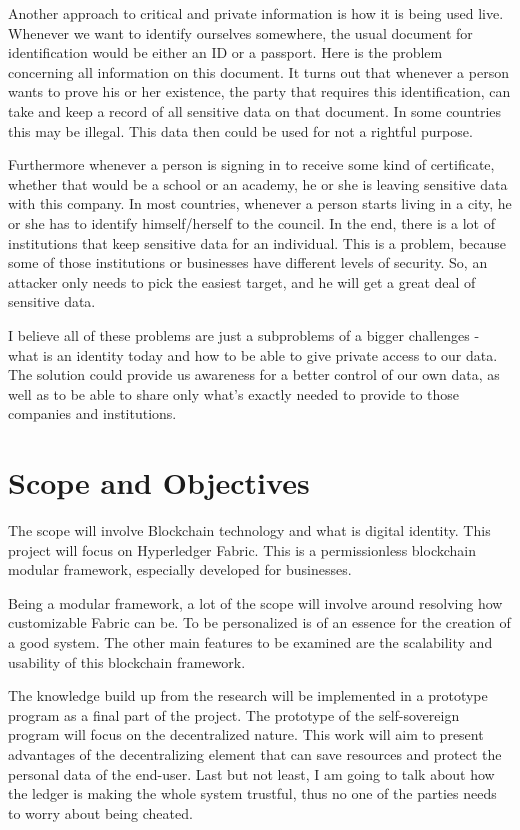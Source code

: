 \documentclass[a4paper,11pt]{report}
\begin{document}
		Another approach to critical and private information is how it is being used live. Whenever we want to identify ourselves somewhere, the usual document for identification would be either an ID or a passport. Here is the problem concerning all information on this document. It turns out that whenever a person wants to prove his or her existence, the party that requires this identification, can take and keep a record of all sensitive data on that document. In some countries this may be illegal. This data then could be used for not a rightful purpose. \cite{alboaie2017private}
		
Furthermore whenever a person is signing in to receive some kind of certificate, whether that would be a school or an academy, he or she is leaving sensitive data with this company. In most countries, whenever a person starts living in a city, he or she has to identify himself/herself to the council. In the end, there is a lot of institutions that keep sensitive data for an individual. This is a problem, because some of those institutions or businesses have different levels of security. So, an attacker only needs to pick the easiest target, and he will get a great deal of sensitive data. 

	I believe all of these problems are just a subproblems of a bigger challenges - what is an identity today and how to be able to give private access to our data. The solution could provide us awareness for a better control of our own data, as well as to be able to share only what’s exactly needed to provide to those companies and institutions.


\section{Scope and Objectives}

\label{introduction-objectives}

The scope will involve Blockchain technology and what is digital identity. This project will focus on Hyperledger Fabric. This is a permissionless blockchain modular framework, especially developed for businesses.
 
Being a modular framework, a lot of the scope will involve around resolving how customizable Fabric can be. To be personalized is of an essence for the creation of a good system. The other main features to be examined are the scalability and usability of this blockchain framework.   

The knowledge build up from the research will be implemented in a prototype program as a final part of the project. The prototype of the self-sovereign program will focus on the decentralized nature. This work will aim to present advantages of the decentralizing element that can save resources and protect the personal data of the end-user. Last but not least, I am going to talk about how the ledger is making the whole system trustful, thus no one of the parties needs to worry about being cheated. 
 	
\end{document}
